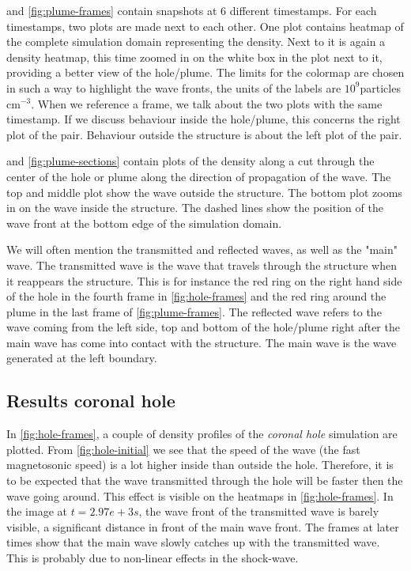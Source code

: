  and \cref{fig:plume-frames} contain snapshots at 6 different timestamps.
For each timestamps, two plots are made next to each other.
One plot contains heatmap of the complete simulation domain representing the density. Next to it is again a density heatmap, this time zoomed in on the white box in the plot next to it, providing a better view of the hole/plume.
The limits for the colormap are chosen in such a way to highlight the wave fronts, the units of the labels are $10^9$particles cm$^{-3}$.
When we reference a frame, we talk about the two plots with the same timestamp. If we discuss behaviour inside the hole/plume, this concerns the right plot of the pair.
Behaviour outside the structure is about the left plot of the pair.

 and \cref{fig:plume-sections} contain plots of the density along a cut through the center of the hole or plume along the direction of propagation of the wave.
The top and middle plot show the wave outside the structure. The bottom plot zooms in on the wave inside the structure.
The dashed lines show the position of the wave front at the bottom edge of the simulation domain.

We will often mention the transmitted and reflected waves, as well as the "main" wave. 
The transmitted wave is the wave that travels through the structure when it reappears the structure.
This is for instance the red ring on the right hand side of the hole in the fourth frame in \cref{fig:hole-frames} and the red ring around the plume in the last frame of \cref{fig:plume-frames}.
The reflected wave refers to the wave coming from the left side, top and bottom of the hole/plume right after the main wave has come into contact with the structure.
The main wave is the wave generated at the left boundary.


\subsection{Results coronal hole}
In \cref{fig:hole-frames}, a couple of density profiles of the \emph{coronal hole} simulation are plotted.
From \cref{fig:hole-initial} we see that the speed of the wave (the fast magnetosonic speed) is a lot higher inside than outside the hole.
Therefore, it is to be expected that the wave transmitted through the hole will be faster then the wave going around.
This effect is visible on the heatmaps in \cref{fig:hole-frames}. 
In the image at $t=2.97e+3s$, the wave front of the transmitted wave is barely visible, a significant distance in front of the main wave front.
The frames at later times show that the main wave slowly catches up with the transmitted wave. This is probably due to non-linear effects in the shock-wave.

